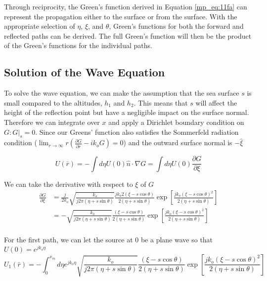 Through reciprocity, the Green's function derived in Equation \ref{mp_eq:11fa} can represent the propagation either to the surface or from the surface. With the appropriate selection of $\eta$, $\xi$, and $\theta$, Green's functions for both the forward and reflected paths can be derived. The full Green's function will then be the product of the Green's functions for the individual paths.

\subsection{Solution of the Wave Equation}
To solve the wave equation, we can make the assumption that the sea surface $s$ is small compared to the altitudes, $h_1$ and $h_2$. This means that $s$ will affect the height of the reflection point but have a negligible impact on the surface normal. Therefore we can integrate over $x$ and apply a Dirichlet boundary condition on $G: G|_s = 0$. Since our Greens' function also satisfies the Sommerfeld radiation condition ($\lim_{r\rightarrow\infty} r\left(\frac{\partial G}{\partial r} -ik_oG\right)= 0$) and the outward surface normal is $-\hat{\xi}$

\begin{equation}
U(\bar{r}) = -\int d\eta U(0) \hat{n} \cdot \nabla G = \int d\eta U(0) \frac{\partial G}{\partial \xi}
\label{mp_eq:12a}
\end{equation}

We can take the derivative with respect to $\xi$ of $G$
\begin{equation}
\begin{aligned}
\frac{\partial G}{\partial \xi} &= \frac{j}{2k_o}\sqrt{\frac{k_o}{j2\pi(\eta+s\sin\theta)}}\frac{jk_o2(\xi-s\cos\theta)}{2(\eta+s\sin\theta)}\exp\left[\frac{jk_o(\xi-s\cos\theta)^2}{2(\eta+s\sin\theta)}\right]\\
&= -\sqrt{\frac{k_o}{j2\pi(\eta+s\sin\theta)}}\frac{(\xi-s\cos\theta)}{2(\eta+s\sin\theta)}\exp\left[\frac{jk_o(\xi-s\cos\theta)^2}{2(\eta+s\sin\theta)}\right]\\
\end{aligned}
\label{mp_eq:12b}
\end{equation}

For the first path, we can let the source at $0$ be a plane wave so that $U(0) = e^{jk_o\eta}$
\begin{equation}
U_1(\bar{r}) =  -\int_{0} ^{x_m} d\eta e^{jk_o\eta} \sqrt{\frac{k_o}{j2\pi(\eta+s\sin\theta)}}\frac{(\xi-s\cos\theta)}{2(\eta+s\sin\theta)}\exp\left[\frac{jk_o(\xi-s\cos\theta)^2}{2(\eta+s\sin\theta)}\right]
\label{mp_eq:12c}
\end{equation}

